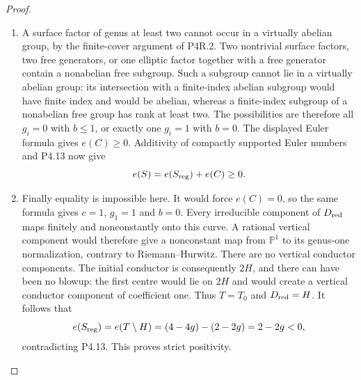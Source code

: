 \begin{proof}
\begin{enumerate}[label={$\langle1\rangle$\arabic*.},leftmargin=*]
\item A surface factor of genus at least two cannot occur
in a virtually abelian group, by the finite-cover
argument of P4R.2. Two nontrivial surface factors,
two free generators, or one elliptic factor together
with a free generator contain a nonabelian free
subgroup. Such a subgroup cannot lie in a virtually
abelian group: its intersection with a finite-index
abelian subgroup would have finite index and would
be abelian, whereas a finite-index subgroup of a
nonabelian free group has rank at least two. The
possibilities are therefore all $g_i=0$ with
$b\le1$, or exactly one $g_i=1$ with $b=0$.
The displayed Euler formula gives $e(C)\ge0$.
Additivity of compactly supported Euler numbers and
P4.13 now give
\[
 e(S)=e(S_{\rm reg})+e(C)\ge0.
\]

\item Finally equality is impossible here. It would force
$e(C)=0$, so the same formula gives $c=1$, $g_1=1$
and $b=0$. Every irreducible component of
$D_{\rm red}$ maps finitely and nonconstantly onto
this curve. A rational vertical component would
therefore give a nonconstant map from $\mathbb P^1$
to its genus-one normalization, contrary to
Riemann--Hurwitz. There are no vertical conductor
components. The initial conductor is consequently
$2H$, and there can have been no blowup: the first
centre would lie on $2H$ and would create a vertical
conductor component of coefficient one. Thus
$T=T_0$ and $D_{\rm red}=H$. It follows that
\[
 e(S_{\rm reg})=e(T\setminus H)
       =(4-4g)-(2-2g)=2-2g<0,
\]
contradicting P4.13. This proves strict positivity.

\end{enumerate}
\end{proof}
